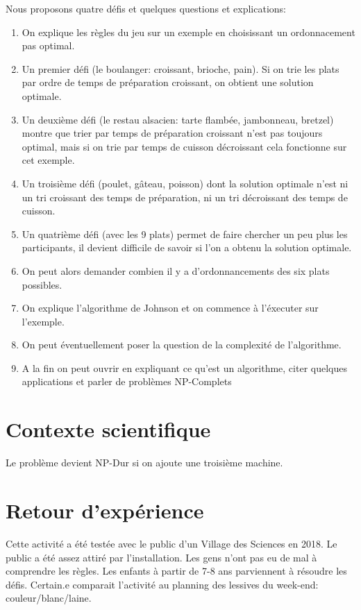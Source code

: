 \documentclass[a4paper]{article}
\begin{document}
Nous proposons quatre défis et quelques questions et explications:
\begin{enumerate}
\item On explique les règles du jeu sur un exemple en choisissant un ordonnacement pas optimal.
\item Un premier défi (le boulanger: croissant, brioche, pain). Si on trie les plats par ordre de temps de préparation croissant, on obtient une solution optimale.
\item Un deuxième défi (le restau alsacien: tarte flambée, jambonneau, bretzel) montre que trier par temps de préparation croissant n'est pas toujours optimal, mais si on trie par temps de cuisson décroissant cela fonctionne sur cet exemple.
\item Un troisième défi (poulet, gâteau, poisson) dont la solution optimale n'est ni un tri croissant des temps de préparation, ni un tri décroissant des temps de cuisson.
\item Un quatrième défi (avec les 9 plats) permet de faire chercher un peu plus les participants, il devient difficile de savoir si l'on a obtenu la solution optimale.
\item On peut alors demander combien il y a d'ordonnancements des six plats possibles.
\item On explique l'algorithme de Johnson et on commence à l'éxecuter sur l'exemple.
\item On peut éventuellement poser la question de la complexité de l'algorithme.
\item A la fin on peut ouvrir en expliquant ce qu'est un algorithme, citer quelques applications et parler de problèmes NP-Complets 
\end{enumerate}

\section{Contexte scientifique}

Le problème devient NP-Dur si on ajoute une troisième machine.
\cite{baker2013principles} \cite{johnson1954optimal}

\section{Retour d'expérience}

Cette activité a été testée avec le public d'un Village des Sciences en 2018. Le public a été assez attiré par l'installation. Les gens n'ont pas eu de mal à comprendre les règles. Les enfants à partir de 7-8 ans parviennent à résoudre les défis. Certain.e comparait l'activité au planning des lessives du week-end: couleur/blanc/laine. 
\end{document}
